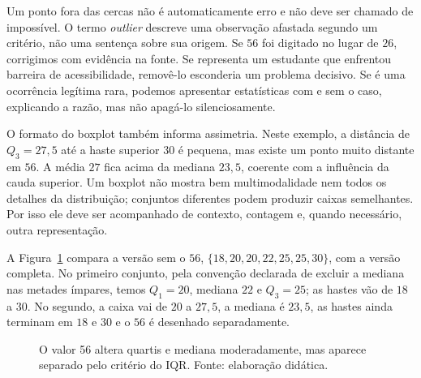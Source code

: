 Um ponto fora das cercas não é automaticamente erro e não deve ser chamado de impossível. O termo \textit{outlier} descreve uma observação afastada segundo um critério, não uma sentença sobre sua origem. Se $56$ foi digitado no lugar de $26$, corrigimos com evidência na fonte. Se representa um estudante que enfrentou barreira de acessibilidade, removê-lo esconderia um problema decisivo. Se é uma ocorrência legítima rara, podemos apresentar estatísticas com e sem o caso, explicando a razão, mas não apagá-lo silenciosamente.

O formato do boxplot também informa assimetria. Neste exemplo, a distância de $Q_3=27{,}5$ até a haste superior $30$ é pequena, mas existe um ponto muito distante em $56$. A média $27$ fica acima da mediana $23{,}5$, coerente com a influência da cauda superior. Um boxplot não mostra bem multimodalidade nem todos os detalhes da distribuição; conjuntos diferentes podem produzir caixas semelhantes. Por isso ele deve ser acompanhado de contexto, contagem e, quando necessário, outra representação.

A Figura~\ref{fig:boxplot-efeito-extremo} compara a versão sem o $56$, $\{18,20,20,22,25,25,30\}$, com a versão completa. No primeiro conjunto, pela convenção declarada de excluir a mediana nas metades ímpares, temos $Q_1=20$, mediana $22$ e $Q_3=25$; as hastes vão de $18$ a $30$. No segundo, a caixa vai de $20$ a $27{,}5$, a mediana é $23{,}5$, as hastes ainda terminam em $18$ e $30$ e o $56$ é desenhado separadamente.

\begin{figure}[htbp]
\centering
{}
\caption{O valor 56 altera quartis e mediana moderadamente, mas aparece separado pelo critério do IQR. Fonte: elaboração didática.}
\label{fig:boxplot-efeito-extremo}
\end{figure}

